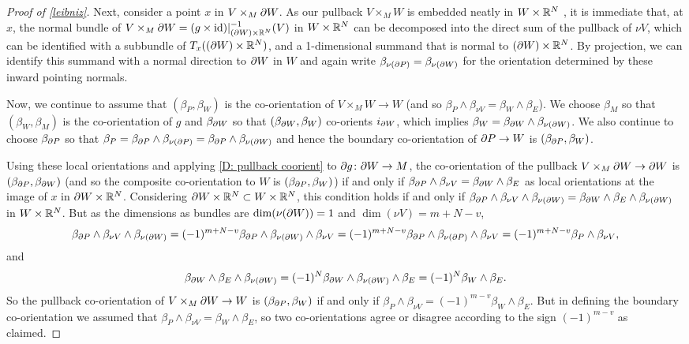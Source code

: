 \begin{proof}[Proof of \cref{leibniz}]
	Next, consider a point $x$ in $V \times_M \partial W$.
	As our pullback $V \times_M W$ is embedded neatly in $W \times \mathbb{R}^N$ \cite[Proposition IV.1.4]{Kos93}, it is immediate that, at $x$, the normal bundle of $V \times_M \partial W = (g \times \mathrm{id})|_{(\partial W) \times \mathbb{R}^N}^{-1}(V)$ in $W \times \mathbb{R}^N$ can be decomposed into the direct sum of the pullback of $\nu V$, which can be identified with a subbundle of $T_x((\partial W) \times \mathbb{R}^N)$, and a 1-dimensional summand that is normal to $(\partial W) \times \mathbb{R}^N$. By projection, we can identify this summand with a normal direction to $\partial W$ in $W$ and again write $\beta_{\nu(\partial P)}=\beta_{\nu(\partial W)}$ for the orientation determined by these inward pointing normals.


	Now, we continue to assume that $(\beta_P, \beta_W)$ is the co-orientation of $V \times_M W \to W$ (and so $\beta_P \wedge \beta_{\nu V} = \beta_W \wedge \beta_E$).
	We choose $\beta_M$ so that $(\beta_W,\beta_M)$ is the co-orientation of $g$ and $\beta_{\partial W}$ so that $(\beta_{\partial W},\beta_W)$ co-orients $i_{\partial W}$, which implies $\beta_W = \beta_{\partial W} \wedge \beta_{\nu(\partial W)}$.
	We also continue to choose $\beta_{\partial P}$ so that $\beta_P = \beta_{\partial P} \wedge \beta_{\nu(\partial P)} = \beta_{\partial P} \wedge \beta_{\nu(\partial W)}$ and hence the boundary co-orientation of $\partial P \to W$ is $(\beta_{\partial P}, \beta_W)$.

	Using these local orientations and applying \cref{D: pullback coorient} to $\partial g \colon \partial W \to M$, the co-orientation of the pullback $V \times_M \partial W \to \partial W$ is $(\beta_{\partial P},\beta_{\partial W})$ (and so the composite co-orientation to $W$ is $(\beta_{\partial P}, \beta_W)$) if and only if $\beta_{\partial P} \wedge \beta_{\nu V} = \beta_{\partial W} \wedge \beta_E$ as local orientations at the image of $x$ in $\partial W \times \mathbb{R}^N$.
	Considering $\partial W \times \mathbb{R}^N \subset W \times \mathbb{R}^N$, this condition holds if and only if $\beta_{\partial P} \wedge \beta_{\nu V} \wedge \beta_{\nu(\partial W)} = \beta_{\partial W} \wedge \beta_E \wedge \beta_{\nu(\partial W)}$ in $W \times \mathbb{R}^N$.
	But as the dimensions as bundles are $\dim(\nu(\partial W)) = 1$ and $\dim(\nu V) = m+N-v$,
	$$\beta_{\partial P} \wedge \beta_{\nu V} \wedge \beta_{\nu(\partial W)} = (-1)^{m+N-v}\beta_{\partial P} \wedge \beta_{\nu(\partial W)} \wedge \beta_{\nu V} = (-1)^{m+N-v}\beta_{\partial P} \wedge \beta_{\nu(\partial P)} \wedge \beta_{\nu V} = (-1)^{m+N-v}\beta_P \wedge \beta_{\nu V} ,$$
	and
	$$\beta_{\partial W} \wedge \beta_E \wedge \beta_{\nu(\partial W)} = (-1)^N\beta_{\partial W} \wedge \beta_{\nu(\partial W)} \wedge \beta_E = (-1)^N\beta_{W} \wedge \beta_E.$$
	So the pullback co-orientation of $V \times_M \partial W \to W$ is $(\beta_{\partial P},\beta_W)$ if and only if $\beta_P \wedge \beta_{\nu V} = (-1)^{m-v}\beta_{W} \wedge \beta_E$.
	But in defining the boundary co-orientation we assumed that $\beta_P \wedge \beta_{\nu V} = \beta_{W} \wedge \beta_E$, so two co-orientations agree or disagree according to the sign $(-1)^{m-v}$ as claimed.
\end{proof}

